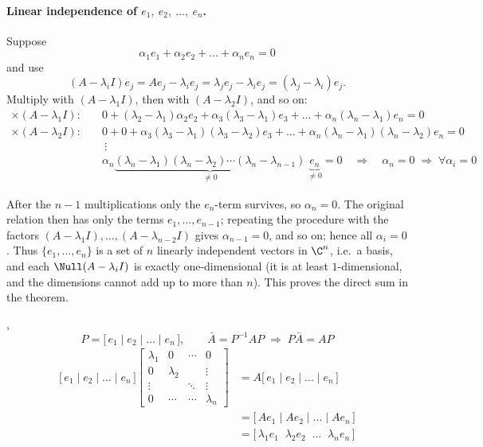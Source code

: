 \paragraph{Linear independence of $e_1,\ e_2,\ \dots,\ e_n$.}
Suppose
\[ \alpha_1 e_1+\alpha_2 e_2+\dots+\alpha_n e_n = 0 \]
and use
\[ (A-\lambda_i I)e_j = Ae_j-\lambda_i e_j = \lambda_j e_j - \lambda_i e_j = (\lambda_j-\lambda_i)e_j . \]
Multiply with $(A-\lambda_1 I)$, then with $(A-\lambda_2 I)$, and so on:
\begin{align*}
\times(A-\lambda_1 I):&\quad 0 + (\lambda_2-\lambda_1)\alpha_2 e_2 + \alpha_3(\lambda_3-\lambda_1)e_3 + \dots + \alpha_n(\lambda_n-\lambda_1)e_n = 0\\
\times(A-\lambda_2 I):&\quad 0+0+\alpha_3(\lambda_3-\lambda_1)(\lambda_3-\lambda_2)e_3+\dots+\alpha_n(\lambda_n-\lambda_1)(\lambda_n-\lambda_2)e_n = 0\\
&\quad\ \vdots\\
&\quad \alpha_n\underbrace{(\lambda_n-\lambda_1)(\lambda_n-\lambda_2)\cdots(\lambda_n-\lambda_{n-1})}_{\neq 0}\,\underbrace{e_n}_{\neq 0} = 0
\quad\Longrightarrow\quad \alpha_n = 0 \;\Longrightarrow\; \forall \alpha_i = 0
\end{align*}
\begin{insight}
After the $n-1$ multiplications only the $e_n$-term survives, so $\alpha_n=0$. The original relation then has only the terms $e_1,\dots,e_{n-1}$; repeating the procedure with the factors $(A-\lambda_1I),\dots,(A-\lambda_{n-2}I)$ gives $\alpha_{n-1}=0$, and so on; hence all $\alpha_i=0$. Thus $\{e_1,\dots,e_n\}$ is a set of $n$ linearly independent vectors in $\C^n$, i.e.\ a basis, and each $\Null(A-\lambda_iI)$ is exactly one-dimensional (it is at least $1$-dimensional, and the dimensions cannot add up to more than $n$). This proves the direct sum in the theorem.
\end{insight}

\sep
\[
P=\big[\,e_1\mid e_2\mid\dots\mid e_n\,\big], \qquad \bar A = P^{-1}AP \;\Rightarrow\; P\bar A = AP
\]
\begin{align*}
\big[\,e_1\mid e_2\mid\dots\mid e_n\,\big]
\begin{bmatrix}\lambda_1 & 0 & \cdots & 0\\ 0 & \lambda_2 & & \vdots\\ \vdots & & \ddots & \vdots\\ 0 & \cdots & \cdots & \lambda_n\end{bmatrix}
&= A\big[\,e_1\mid e_2\mid\dots\mid e_n\,\big]\\
&= \big[\,Ae_1\mid Ae_2\mid\dots\mid Ae_n\,\big]\\
&= \big[\,\lambda_1 e_1 \;\; \lambda_2 e_2 \;\; \dots\;\; \lambda_n e_n\,\big]
\end{align*}

